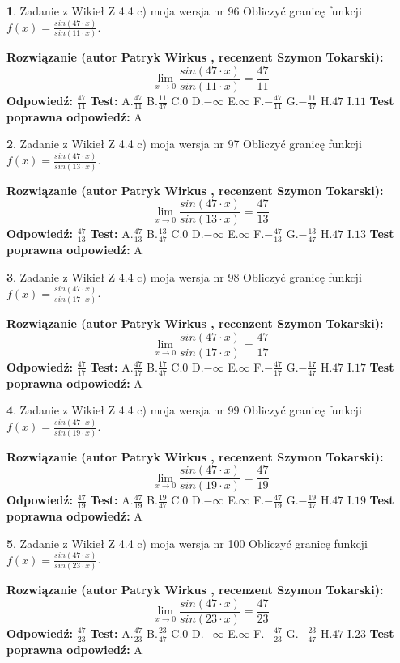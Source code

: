 \documentclass[12pt, a4paper]{article}
\theoremstyle{definition} %
\newtheorem{zad}{}
\newcommand{\zadStart}[1]{\begin{zad}#1\newline}
\newcommand{\zadStop}{\end{zad}}
\newcommand{\rozwStart}[2]{\noindent \textbf{Rozwiązanie (autor #1 , recenzent #2): }\newline}
\newcommand{\rozwStop}{\newline}
\newcommand{\odpStart}{\noindent \textbf{Odpowiedź:}\newline}
\newcommand{\odpStop}{\newline}
\newcommand{\testStart}{\noindent \textbf{Test:}\newline}
\newcommand{\testStop}{\newline}
\newcommand{\kluczStart}{\noindent \textbf{Test poprawna odpowiedź:}\newline}
\newcommand{\kluczStop}{\newline}
\begin{document}
\zadStart{Zadanie z Wikieł Z 4.4 c) moja wersja nr 96}
Obliczyć granicę funkcji $f(x)=\frac{sin(47\cdot x)}{sin(11\cdot x)}$.
\zadStop
\rozwStart{Patryk Wirkus}{Szymon Tokarski}
$$\lim\limits_{x\to 0}\frac{sin(47\cdot x)}{sin(11\cdot x)}=
\frac{47}{11}$$
\rozwStop
\odpStart
$\frac{47}{11}$
\odpStop
\testStart
A.$\frac{47}{11}$
B.$\frac{11}{47}$
C.$0$
D.$-\infty$
E.$\infty$
F.$-\frac{47}{11}$
G.$-\frac{11}{47}$
H.$47$
I.$11$
\testStop
\kluczStart
A
\kluczStop



\zadStart{Zadanie z Wikieł Z 4.4 c) moja wersja nr 97}
Obliczyć granicę funkcji $f(x)=\frac{sin(47\cdot x)}{sin(13\cdot x)}$.
\zadStop
\rozwStart{Patryk Wirkus}{Szymon Tokarski}
$$\lim\limits_{x\to 0}\frac{sin(47\cdot x)}{sin(13\cdot x)}=
\frac{47}{13}$$
\rozwStop
\odpStart
$\frac{47}{13}$
\odpStop
\testStart
A.$\frac{47}{13}$
B.$\frac{13}{47}$
C.$0$
D.$-\infty$
E.$\infty$
F.$-\frac{47}{13}$
G.$-\frac{13}{47}$
H.$47$
I.$13$
\testStop
\kluczStart
A
\kluczStop



\zadStart{Zadanie z Wikieł Z 4.4 c) moja wersja nr 98}
Obliczyć granicę funkcji $f(x)=\frac{sin(47\cdot x)}{sin(17\cdot x)}$.
\zadStop
\rozwStart{Patryk Wirkus}{Szymon Tokarski}
$$\lim\limits_{x\to 0}\frac{sin(47\cdot x)}{sin(17\cdot x)}=
\frac{47}{17}$$
\rozwStop
\odpStart
$\frac{47}{17}$
\odpStop
\testStart
A.$\frac{47}{17}$
B.$\frac{17}{47}$
C.$0$
D.$-\infty$
E.$\infty$
F.$-\frac{47}{17}$
G.$-\frac{17}{47}$
H.$47$
I.$17$
\testStop
\kluczStart
A
\kluczStop



\zadStart{Zadanie z Wikieł Z 4.4 c) moja wersja nr 99}
Obliczyć granicę funkcji $f(x)=\frac{sin(47\cdot x)}{sin(19\cdot x)}$.
\zadStop
\rozwStart{Patryk Wirkus}{Szymon Tokarski}
$$\lim\limits_{x\to 0}\frac{sin(47\cdot x)}{sin(19\cdot x)}=
\frac{47}{19}$$
\rozwStop
\odpStart
$\frac{47}{19}$
\odpStop
\testStart
A.$\frac{47}{19}$
B.$\frac{19}{47}$
C.$0$
D.$-\infty$
E.$\infty$
F.$-\frac{47}{19}$
G.$-\frac{19}{47}$
H.$47$
I.$19$
\testStop
\kluczStart
A
\kluczStop



\zadStart{Zadanie z Wikieł Z 4.4 c) moja wersja nr 100}
Obliczyć granicę funkcji $f(x)=\frac{sin(47\cdot x)}{sin(23\cdot x)}$.
\zadStop
\rozwStart{Patryk Wirkus}{Szymon Tokarski}
$$\lim\limits_{x\to 0}\frac{sin(47\cdot x)}{sin(23\cdot x)}=
\frac{47}{23}$$
\rozwStop
\odpStart
$\frac{47}{23}$
\odpStop
\testStart
A.$\frac{47}{23}$
B.$\frac{23}{47}$
C.$0$
D.$-\infty$
E.$\infty$
F.$-\frac{47}{23}$
G.$-\frac{23}{47}$
H.$47$
I.$23$
\testStop
\kluczStart
A
\kluczStop
\end{document}
